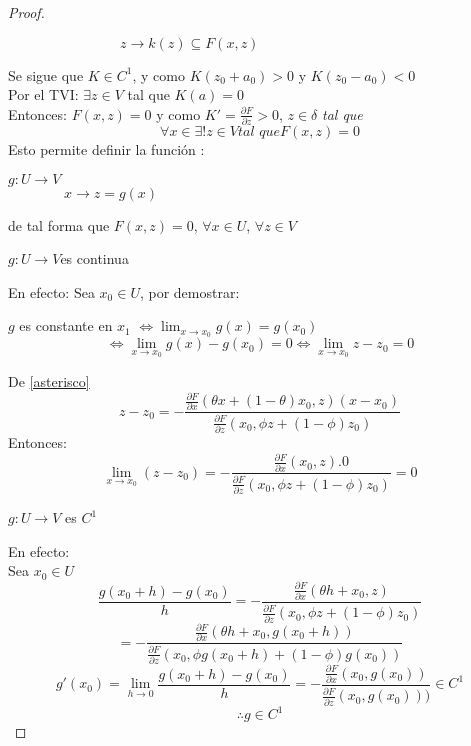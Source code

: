 \begin{proof}
\begin{center}
    $\qquad \qquad \qquad \qquad z\longrightarrow k(z)\subseteq F(x,z)$
\end{center}
Se sigue que $K\in C^{1}$, y como $K(z_{0}+a_{0})>0$ y $K(z_{0}-a_{0})<0 $\\
Por el TVI: $\exists z\in V$ tal que $K(a)=0$\\
Entonces: $F(x,z)=0$ y como $K'=\frac{\partial F}{\partial z} > 0$, $z \in \delta$ \textit{tal que } $$\forall x\in \exists!z\in V \textit{tal que} F(x,z)=0$$
Esto permite definir la funci\'on :
\begin{center}
    $g:U \rightarrow V$\\
    $\qquad \qquad  x\longrightarrow z=g(x)$
\end{center}
de tal forma que $F(x,z)=0$, $\forall x\in U$, $\forall z\in V$\\
\begin{Afi}
 $g: U \rightarrow V $es continua\\
 \end{Afi}
 En efecto: Sea $x_{0}\in U$, por demostrar: \\
 \begin{center}
     $g$ es constante  en $x_{1}$ $\Longleftrightarrow\lim_{x \to x_{0}}g(x)=g(x_{0})$\\ $$\Longleftrightarrow \lim_{x \to x_{0}}g(x)-g(x_{0})=0 \Longleftrightarrow\lim_{x \to x_{0}}z-z_{0}=0$$
 \end{center}
 De \ref{asterisco}\\
      $$z-z_{0}=-\frac{\frac{\partial F}{\partial x}(\theta x+(1-\theta)x_{0},z)(x-x_{0})}{\frac{\partial F}{\partial z }(x_{0}, \phi z + (1-\phi)z_{0})}$$
 Entonces:
    $$\lim_{x \to x_{0}}(z-z_{0})= -\frac{\frac{\partial F}{\partial x}(x_{0},z).0}{\frac{\partial F}{\partial z }(x_{0}, \phi z + (1-\phi)z_{0})}=0$$
\begin{Afi}
$g: U \rightarrow V $ es $C^{1}$
\end{Afi}
En efecto: 
\\Sea $x_0\in U$\\
   $$ \frac{g(x_{0}+h)-g(x_{0})}{h}=-\frac{\frac{\partial F}{\partial x}(\theta h+x_{0},z)}{\frac{\partial F}{\partial z }(x_{0}, \phi z+(1-\phi)z_{0} )}$$
   $$=-\frac{\frac{\partial F}{\partial x}(\theta h+x_{0},g(x_{0}+h))}{\frac{\partial F}{\partial z }(x_{0}, \phi g(x_{0}+h)+(1-\phi)g(x_{0}) )}$$
 $$g'(x_{0})=\lim_{h \to 0}\frac{g(x_{0}+h)-g(x_{0})}{h} =-\frac{\frac{\partial F}{\partial x}(x_{0},g(x_{0}))}{\frac{\partial F}{\partial z }(x_{0}, g(x_{0})) )}\in C^{1}$$
$$\therefore g \in C^{1}$$
\end{proof}